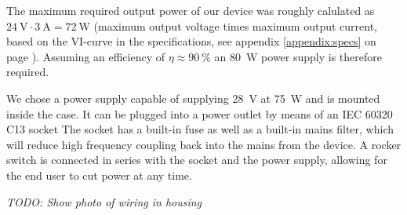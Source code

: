 The   maximum   required   output   power    of   our   device   was   roughly
calulated   as  $\SI{24}{\volt}   \cdot   \SI{3}{\ampere}  =   \SI{72}{\watt}$
(maximum  output   voltage  times  maximum   output  current,  based   on  the
VI-curve  in   the  specifications,   see  appendix   \ref{appendix:specs}  on
page  \pageref{appendix:specs}).   Assuming   an  efficiency  of  $\eta\approx
\SI{90}{\percent}$ an \SI{80}{W} power supply is therefore required.

We chose a power supply  capable of supplying \SI{28}{\volt} at \SI{75}{\watt}
and is  mounted inside the  case.  It  can be plugged  into a power  outlet by
means of an IEC  60320 C13 socket The socket has a built-in  fuse as well as a
built-in mains filter, which will reduce high frequency coupling back into the
mains from the device.  A rocker switch is connected in series with the socket
and the power supply, allowing for the end user to cut power at any time.

%



\emph{TODO: Show photo of wiring in housing}
